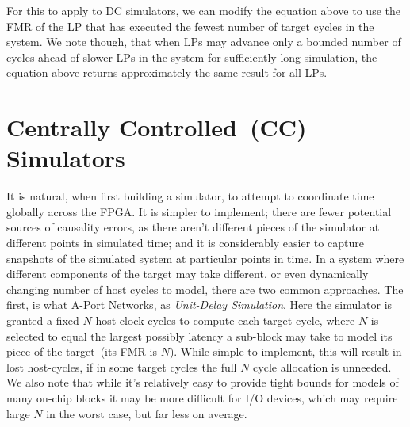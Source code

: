 For this to apply to DC simulators, we can modify the equation above to use the FMR of
the LP that has executed the fewest number of target cycles in the system. We
note though, that when LPs may advance only a bounded number of cycles ahead of
slower LPs in the system for sufficiently long simulation, the equation above
returns approximately the same result for all LPs.

\section{Centrally Controlled~(CC) Simulators}

It is natural, when first building a simulator, to attempt to coordinate time
globally across the FPGA. It is simpler to implement; there are fewer potential
sources of causality errors, as there aren't different pieces of the simulator at different points in simulated time; and it is considerably
easier to capture snapshots of the simulated system at particular points in
time. In a system where different components of the target may take different,
or even dynamically changing number of host cycles to model, there are two
common approaches.  The first, is what A-Port Networks, as \emph{Unit-Delay
Simulation}. Here the simulator is granted a fixed $N$ host-clock-cycles to
compute each target-cycle, where $N$ is selected to equal the largest possibly
latency a sub-block may take to model its piece of the target~(its FMR is $N$). While simple to
implement, this will result in lost host-cycles, if in some target cycles the
full $N$ cycle allocation is unneeded.  We also note that while it's
relatively easy to provide tight bounds for models of many on-chip
blocks it may be more difficult for I/O devices, which may require large $N$
in the worst case, but far less on average.

